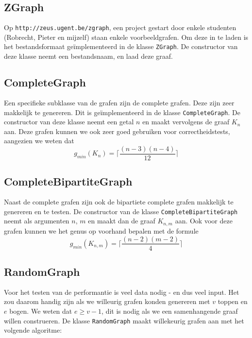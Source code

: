 \documentclass{article}
\begin{document}
\subsection{ZGraph}
Op \verb#http://zeus.ugent.be/zgraph#, een project gestart door enkele studenten
(Robrecht, Pieter en mijzelf) staan enkele voorbeeldgrafen. Om deze in te laden
is het bestandsformaat ge\"implementeerd in de klasse \verb#ZGraph#. De
constructor van deze klasse neemt een bestandsnaam, en laad deze graaf.

\subsection{CompleteGraph}
\label{complete-graph}
Een specifieke subklasse van de grafen zijn de complete grafen. Deze zijn zeer
makkelijk te genereren. Dit is ge\"implementeerd in de klasse
\verb#CompleteGraph#. De constructor van deze klasse neemt een getal $n$ en
maakt vervolgens de graaf $K_n$ aan. Deze grafen kunnen we ook zeer goed
gebruiken voor correctheidstests, aangezien we weten dat
\begin{equation*}
g_{min}(K_n) = \lceil \frac{(n - 3) (n - 4)}{12} \rceil
\end{equation*}

\subsection{CompleteBipartiteGraph}
\label{complete-bipartite-graph}
Naast de complete grafen zijn ook de bipartiete complete grafen makkelijk te
genereren en te testen. De constructor van de klasse
\verb#CompleteBipartiteGraph# neemt als argumenten $n$, $m$ en maakt dan de
graaf $K_{n,m}$ aan. Ook voor deze grafen kunnen we het genus op voorhand
bepalen met de formule
\begin{equation*}
g_{min}(K_{n,m}) = \lceil \frac{(n - 2) (m - 2)}{4} \rceil
\end{equation*}

\subsection{RandomGraph}
Voor het testen van de performantie is veel data nodig - en dus veel input. Het
zou daarom handig zijn als we willeurig grafen konden genereren met $v$ toppen
en $e$ bogen. We weten dat $e \geq v - 1$, dit is nodig als we een samenhangende
graaf willen construeren.  De klasse \verb#RandomGraph# maakt willekeurig grafen
aan met het volgende algoritme:
\newline
\end{document}
